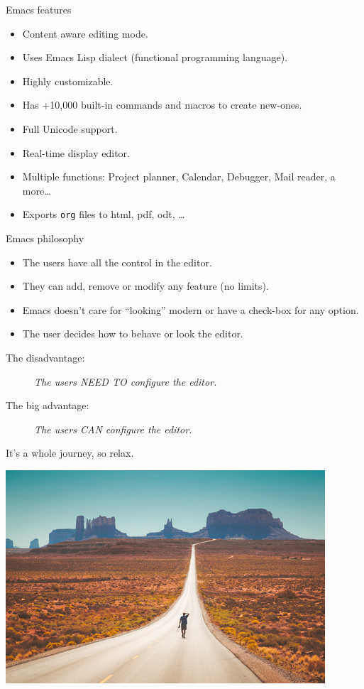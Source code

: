 \documentclass[presentation]{beamer}
\begin{document}
\begin{frame}[label={sec:orgeda3a9d},fragile]{Emacs features}
 \begin{itemize}
\item Content aware editing mode.
\item Uses Emacs Lisp dialect (functional programming language).
\item Highly customizable.
\item Has +10,000 built-in commands and macros to create new-ones.
\item Full Unicode support.
\item Real-time display editor.
\item Multiple functions: Project planner, Calendar, Debugger, Mail reader, a more\ldots{}
\item Exports \texttt{org} files to html, pdf, odt, \ldots{}
\end{itemize}
\end{frame}

\begin{frame}[label={sec:org8aca31f}]{Emacs philosophy}
\begin{itemize}
\item The users have all the control in the editor.
\item They can add, remove or modify any feature (no limits).
\item Emacs doesn't care for ``looking'' modern or have a check-box for any option.
\item The user decides how to behave or look the editor.
\end{itemize}


\begin{description}
\item[{The disadvantage:}] \emph{The users NEED TO configure the editor.}
\item[{The big advantage:}] \emph{The users CAN configure the editor.}
\end{description}
\end{frame}


\begin{frame}[label={sec:org80a685c}]{It's a whole journey, so relax.}
\begin{center}
\includegraphics[width=\textwidth]{./road.png}
\end{center}
\end{frame}
\end{document}
